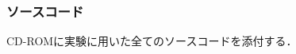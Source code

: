       \subsubsection{ソースコード}
        \label{sec:ソースコード}
         \par CD-ROMに実験に用いた全てのソースコードを添付する．
    

      
          
          
          
